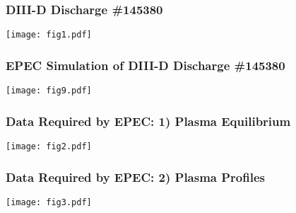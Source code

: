 \documentclass{beamer}
\begin{document}
\begin{frame}
\frametitle{DIII-D Discharge \#145380}

\begin{center}
\texttt{[image: fig1.pdf]}
\end{center}

\end{frame}

\begin{frame}
\frametitle{EPEC Simulation of DIII-D Discharge \#145380}

\begin{center}
\texttt{[image: fig9.pdf]}
\end{center}

\end{frame}

\begin{frame}
\frametitle{Data Required by EPEC: 1) Plasma Equilibrium}

\begin{center}
\texttt{[image: fig2.pdf]}
\end{center}

\end{frame}

\begin{frame}
\frametitle{Data Required by EPEC: 2) Plasma Profiles}

\begin{center}
\texttt{[image: fig3.pdf]}
\end{center}

\end{frame}
\end{document}
